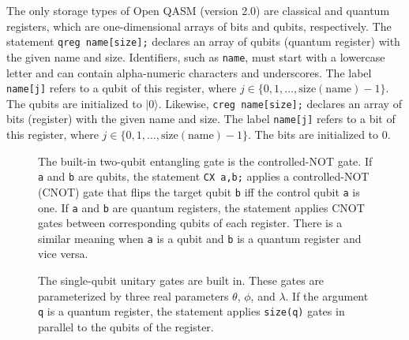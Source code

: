 \documentclass[USenglish,12pt,fleqn]{article} %
\newcommand*{\code}{\texttt}
\begin{document}
The only storage types of Open QASM (version 2.0) are classical and quantum registers, which are one-dimensional arrays of bits and qubits, respectively. The statement \code{qreg name[size];} declares an array of qubits (quantum register) with the given name and size. Identifiers, such as \code{name}, must start with a lowercase letter and can contain alpha-numeric characters and underscores. The label \code{name[j]} refers to a qubit of this register, where $j\in \{0,1,\dots,\mathrm{size}(\mathrm{name})-1\}$. The qubits are initialized to $|0\rangle$. Likewise, \code{creg name[size];} declares an array of bits (register) with the given name and size. The label \code{name[j]} refers to a bit of this register, where $j\in \{0,1,\dots,\mathrm{size}(\mathrm{name})-1\}$. The bits are initialized to $0$.

\begin{figure}
\begin{minipage}{.2\textwidth}

\end{minipage}
\begin{minipage}{.2\textwidth}

\end{minipage}
\begin{minipage}{.2\textwidth}

\end{minipage}
\begin{minipage}{.2\textwidth}

\end{minipage}
\caption{The built-in two-qubit entangling gate is the controlled-NOT gate. If \code{a} and \code{b} are qubits, the statement \code{CX a,b;} applies a controlled-NOT (CNOT) gate that flips the target qubit \code{b} iff the control qubit \code{a} is one. If \code{a} and \code{b} are quantum registers, the statement applies CNOT gates between corresponding qubits of each register. There is a similar meaning when \code{a} is a qubit and \code{b} is a quantum register and vice versa.
\label{fig:cnot}}
\end{figure}

\begin{figure}
\hspace{.2\textwidth}
\begin{minipage}{.2\textwidth}

\end{minipage}
\hspace{.1\textwidth}
\begin{minipage}{.2\textwidth}

\end{minipage}
\caption{The single-qubit unitary gates are built in. These gates are parameterized by three real parameters $\theta$, $\phi$, and $\lambda$. If the argument \code{q} is a quantum register, the statement applies \code{size(q)} gates in parallel to the qubits of the register.\label{fig:utpl}}
\end{figure}
\end{document}
